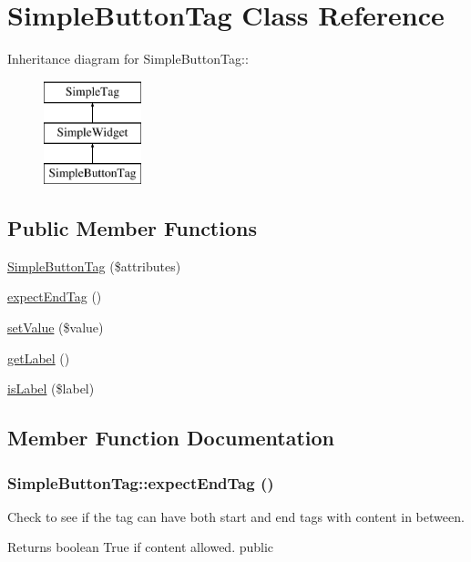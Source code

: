 \hypertarget{class_simple_button_tag}{
\section{SimpleButtonTag Class Reference}
\label{class_simple_button_tag}
}
Inheritance diagram for SimpleButtonTag::\begin{figure}[H]
\begin{center}
\leavevmode
\includegraphics[height=3cm]{class_simple_button_tag}
\end{center}
\end{figure}
\subsection*{Public Member Functions}
\begin{DoxyCompactItemize}
\item 
\hyperlink{class_simple_button_tag_abfc68a44b7a968a9255c69f374ed41ec}{SimpleButtonTag} (\$attributes)
\item 
\hyperlink{class_simple_button_tag_a079c610a66083e6b4eea9a6beb8a8294}{expectEndTag} ()
\item 
\hyperlink{class_simple_button_tag_a36d1a217cd1a0ec83bc0de7d7d436057}{setValue} (\$value)
\item 
\hyperlink{class_simple_button_tag_a2546c1ec1cc7e096da711cdb66a3178d}{getLabel} ()
\item 
\hyperlink{class_simple_button_tag_a5efa27afe64fbb8ce8ef546df97c0db5}{isLabel} (\$label)
\end{DoxyCompactItemize}


\subsection{Member Function Documentation}
\hypertarget{class_simple_button_tag_a079c610a66083e6b4eea9a6beb8a8294}{
\subsubsection[{expectEndTag}]{\setlength{\rightskip}{0pt plus 5cm}SimpleButtonTag::expectEndTag ()}}
\label{class_simple_button_tag_a079c610a66083e6b4eea9a6beb8a8294}
Check to see if the tag can have both start and end tags with content in between. \begin{DoxyReturn}{Returns}
boolean True if content allowed.  public 
\end{DoxyReturn}


